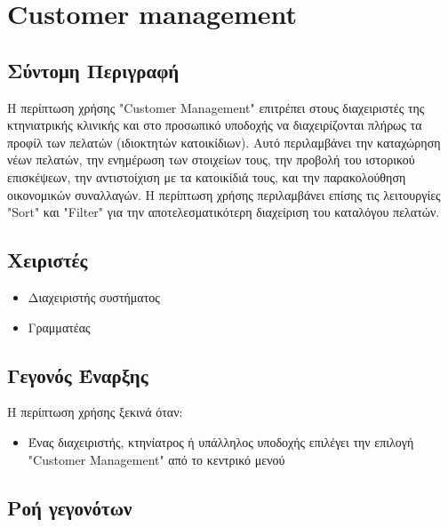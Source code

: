 \documentclass[12pt,a4paper,twoside]{book}
\begin{document}
\section{Customer management}

\subsection{Σύντομη Περιγραφή}
Η περίπτωση χρήσης "Customer Management" επιτρέπει στους διαχειριστές της κτηνιατρικής κλινικής και στο προσωπικό υποδοχής να διαχειρίζονται πλήρως τα προφίλ των πελατών (ιδιοκτητών κατοικίδιων). Αυτό περιλαμβάνει την καταχώρηση νέων πελατών, την ενημέρωση των στοιχείων τους, την προβολή του ιστορικού επισκέψεων, την αντιστοίχιση με τα κατοικίδιά τους, και την παρακολούθηση οικονομικών συναλλαγών. Η περίπτωση χρήσης περιλαμβάνει επίσης τις λειτουργίες "Sort" και "Filter" για την αποτελεσματικότερη διαχείριση του καταλόγου πελατών. %

\subsection{Χειριστές}
\begin{itemize}
  \item Διαχειριστής συστήματος
  \item Γραμματέας
\end{itemize}

\subsection{Γεγονός Έναρξης}
Η περίπτωση χρήσης ξεκινά όταν:
\begin{itemize}
  \item Ένας διαχειριστής, κτηνίατρος ή υπάλληλος υποδοχής επιλέγει την επιλογή "Customer Management" από το κεντρικό μενού %
\end{itemize}

\subsection{Ροή γεγονότων}
\end{document}
